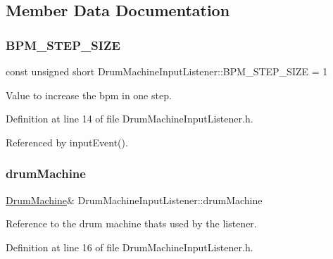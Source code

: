\subsection{Member Data Documentation}
\mbox{\label{class_drum_machine_input_listener_ad4f83d21be6ff1ba703a27d8c9a04c9a}} 
\subsubsection{\texorpdfstring{B\+P\+M\+\_\+\+S\+T\+E\+P\+\_\+\+S\+I\+ZE}{BPM\_STEP\_SIZE}}
{\footnotesize\ttfamily const unsigned short Drum\+Machine\+Input\+Listener\+::\+B\+P\+M\+\_\+\+S\+T\+E\+P\+\_\+\+S\+I\+ZE = 1\hspace{0.3cm}{\ttfamily [private]}}



Value to increase the bpm in one step. 



Definition at line 14 of file Drum\+Machine\+Input\+Listener.\+h.



Referenced by input\+Event().

\mbox{\label{class_drum_machine_input_listener_ae3f80aad0a5c4b2e4ad2712423102feb}} 
\subsubsection{\texorpdfstring{drum\+Machine}{drumMachine}}
{\footnotesize\ttfamily \hyperlink{class_drum_machine}{Drum\+Machine}\& Drum\+Machine\+Input\+Listener\+::drum\+Machine\hspace{0.3cm}{\ttfamily [private]}}



Reference to the drum machine thats used by the listener. 



Definition at line 16 of file Drum\+Machine\+Input\+Listener.\+h.



